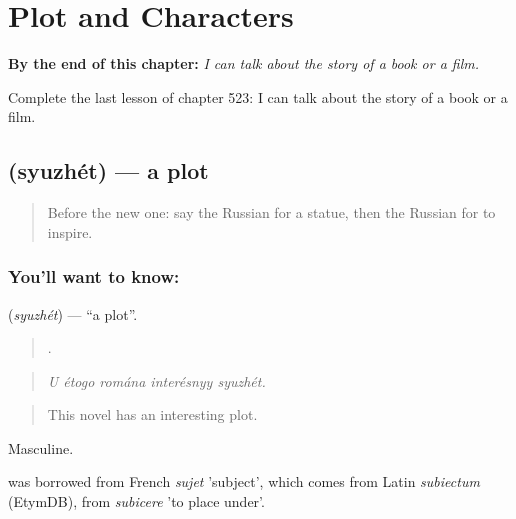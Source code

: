 
\chapter{Plot and Characters}
\label{ch:ru-plot-and-characters}

\begin{chapteropening}
\textbf{By the end of this chapter:} \emph{I can talk about the story of a book or a film.}

Complete the last lesson of chapter 523: I can talk about the story of a book or a film.
\end{chapteropening}

\section[\texorpdfstring{\ru{сюжет} (syuzhét)}{сюжет (syuzhét)}]{ (syuzhét) — a plot}

\label{lesson:RU-C523-syuzhet}



\begin{quote}
Before the new one: say the Russian for a statue, then the Russian for to inspire.
\end{quote}

\subsection*{You'll want to know: }
\textbf{} (\emph{syuzhét}) — \textquotedblleft{}a plot\textquotedblright{}.

\begin{quote}
    .
\end{quote}

\begin{quote}
\emph{U étogo romána interésnyy syuzhét.}
\end{quote}

\begin{quote}
This novel has an interesting plot.
\end{quote}

Masculine.

\begin{cousinweb}
\emph{} was borrowed from French \emph{sujet} 'subject', which comes from Latin \emph{subiectum} (EtymDB), from \emph{subicere} 'to place under'.
\end{cousinweb}

